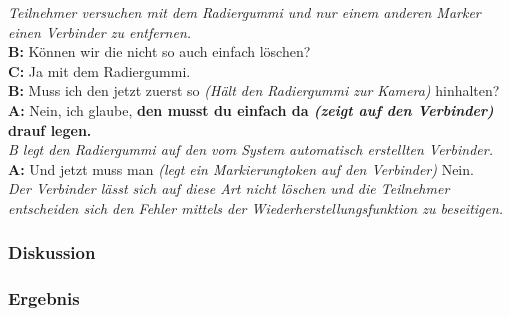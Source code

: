 \begin{transkript}
	\emph{Teilnehmer versuchen mit dem Radiergummi und nur einem anderen Marker einen Verbinder zu entfernen.}\\
	\textbf{B:} Können wir die nicht so auch einfach löschen?\\
	\textbf{C:} Ja mit dem Radiergummi.\\
	\textbf{B:} Muss ich den jetzt zuerst so \emph{(Hält den Radiergummi zur Kamera)} hinhalten?\\
	\textbf{A:} Nein, ich glaube, \textbf{den musst du einfach da \emph{(zeigt auf den Verbinder)} drauf legen.}\\
	\emph{B legt den Radiergummi auf den vom System automatisch erstellten Verbinder.}\\
	\textbf{A:} Und jetzt muss man \emph{(legt ein Markierungtoken auf den Verbinder)} Nein.\\
	\emph{Der Verbinder lässt sich auf diese Art nicht löschen und die Teilnehmer entscheiden sich den Fehler mittels der Wiederherstellungsfunktion zu beseitigen.}
\end{transkript}

\subsubsection{Diskussion} %

\subsubsection{Ergebnis} %


